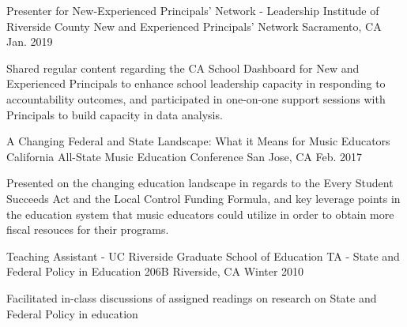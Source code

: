 \begin{cventries}
  \cventry
    {Presenter for New-Experienced Principals' Network - Leadership Institude of
    Riverside County} %
    {New and Experienced Principals' Network} %
    {Sacramento, CA} %
    {Jan. 2019} %
    {
      \begin{cvitems} %
        \item {Shared regular content regarding the CA School Dashboard for New and 
        Experienced Principals to enhance school leadership capacity in responding to 
        accountability outcomes, and participated in one-on-one support sessions with 
        Principals to build capacity in data analysis.}
      \end{cvitems}
    }


  \cventry
    {A Changing Federal and State Landscape: What it Means for Music Educators} %
    {California All-State Music Education Conference} %
    {San Jose, CA} %
    {Feb. 2017} %
    {
      \begin{cvitems} %
        \item {Presented on the changing education landscape in regards to the Every
        Student Succeeds Act and the Local Control Funding Formula, and key leverage
        points in the education system that music educators could utilize in order
        to obtain more fiscal resouces for their programs.}
      \end{cvitems}
    }



  \cventry
    {Teaching Assistant - UC Riverside Graduate School of Education} %
    {TA - State and Federal Policy in Education 206B} %
    {Riverside, CA} %
    {Winter 2010} %
    {
      \begin{cvitems} %
        \item {Facilitated in-class discussions of assigned readings on research on 
        State and Federal Policy in education }
      \end{cvitems}
    }


\end{cventries}
